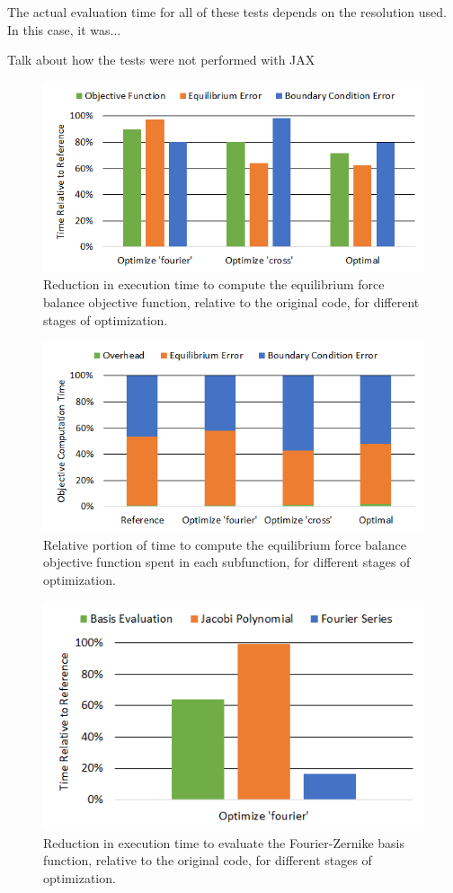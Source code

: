 \documentclass{article}
\begin{document}
The actual evaluation time for all of these tests depends on the resolution used.  In this case, it was...

Talk about how the tests were not performed with JAX

%
\begin{figure}[H]
	\centering
	\includegraphics[width=0.6\linewidth,center]{./figs/compute_time_opt.png}
	\caption{Reduction in execution time to compute the equilibrium force balance objective function, relative to the original code, for different stages of optimization.}
	\label{fig:compute_opt}
\end{figure}
%
\begin{figure}[H]
	\centering
	\includegraphics[width=0.6\linewidth,center]{./figs/compute_time_rel.png}
	\caption{Relative portion of time to compute the equilibrium force balance objective function spent in each subfunction, for different stages of optimization.}
	\label{fig:compute_opt}
\end{figure}
%
\begin{figure}[H]
	\centering
	\includegraphics[width=0.6\linewidth,center]{./figs/compile_time_opt.png}
	\caption{Reduction in execution time to evaluate the Fourier-Zernike basis function, relative to the original code, for different stages of optimization.}
	\label{fig:compute_opt}
\end{figure}
\end{document}
